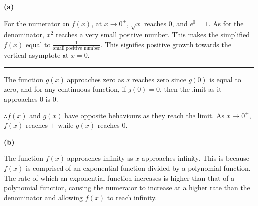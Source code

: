 \documentclass[answers,addpoints]{exam}
\begin{document}
\begin{questions}

\begin{solution}

\begin{center}
\end{center}

\textbf{(a)}

For the numerator on $f(x)$, at $x \to 0^{+}$, $\sqrt{x}$ reaches $0$, and $e^{0}=1$. As for the denominator, $x^{2}$ reaches a very small positive number. This makes the simplified $f(x)$ equal to $\frac{1}{\text{small positive number}}$. This signifies positive growth towards the vertical asymptote at $x=0$.

\hrule

The function $g(x)$ approaches zero as $x$ reaches zero since $g(0)$ is equal to zero, and for any continuous function, if $g(0)=0$, then the limit as it approaches $0$ is $0$.

$\therefore f(x)$ and $g(x)$ have opposite behaviours as they reach the limit. As $x \to 0^{+}$, $f(x)$ reaches $+$ while $g(x)$ reaches $0$.

\textbf{(b)}

The function $f(x)$ approaches infinity as $x$ approaches infinity. This is because $f(x)$ is comprised of an exponential function divided by a polynomial function. The rate of which an exponential function increases is higher than that of a polynomial function, causing the numerator to increase at a higher rate than the denominator and allowing $f(x)$ to reach infinity.


\end{solution}
\end{questions}
\end{document}
